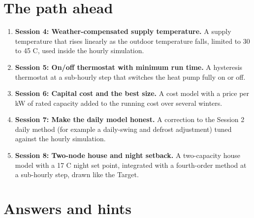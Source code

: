 \documentclass[11pt,a4paper]{article}
\begin{document}
\section{The path ahead}
\begin{enumerate}[nosep]
\item \textbf{Session 4: Weather-compensated supply temperature.} A supply temperature that rises linearly as the outdoor temperature falls, limited to 30 to 45 C, used inside the hourly simulation.
\item \textbf{Session 5: On/off thermostat with minimum run time.} A hysteresis thermostat at a sub-hourly step that switches the heat pump fully on or off.
\item \textbf{Session 6: Capital cost and the best size.} A cost model with a price per kW of rated capacity added to the running cost over several winters.
\item \textbf{Session 7: Make the daily model honest.} A correction to the Session 2 daily method (for example a daily-swing and defrost adjustment) tuned against the hourly simulation.
\item \textbf{Session 8: Two-node house and night setback.} A two-capacity house model with a 17 C night set point, integrated with a fourth-order method at a sub-hourly step, drawn like the Target.
\end{enumerate}

\section{Answers and hints}
\end{document}
